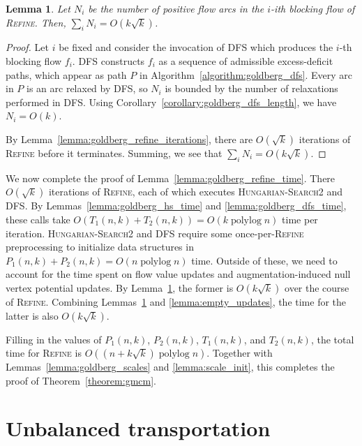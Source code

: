 \documentclass[11pt]{article}
\def\polylog{\mathop{\mathrm{polylog}}}
\theoremstyle{plain}
\newtheorem{lemma}{Lemma}[section]
\numberwithin{figure}{section}
\begin{document}
\begin{lemma}
\label{lemma:goldberg_bf_size}
Let $N_i$ be the number of positive flow arcs in the $i$-ith blocking flow
of \textsc{Refine}.
Then, $\sum_i N_i = O(k\sqrt{k})$.
\end{lemma}

\begin{proof}
Let $i$ be fixed and consider the invocation of \textsc{DFS} which produces the
$i$-th blocking flow $f_i$.
\textsc{DFS} constructs $f_i$ as a sequence of admissible excess-deficit paths,
which appear as path $P$ in Algorithm~\ref{algorithm:goldberg_dfs}.
Every arc in $P$ is an arc relaxed by \textsc{DFS}, so $N_i$ is bounded by the
number of relaxations performed in \textsc{DFS}.
Using Corollary~\ref{corollary:goldberg_dfs_length}, we have $N_i = O(k)$.

By Lemma~\ref{lemma:goldberg_refine_iterations}, there are $O(\sqrt{k})$
iterations of \textsc{Refine} before it terminates.
Summing, we see that $\sum_i N_i = O(k\sqrt{k})$.
\end{proof}

We now complete the proof of Lemma~\ref{lemma:goldberg_refine_time}.
There $O(\sqrt{k})$ iterations of \textsc{Refine}, each of which executes
\textsc{Hungarian-Search2} and \textsc{DFS}.
By Lemmas~\ref{lemma:goldberg_hs_time} and \ref{lemma:goldberg_dfs_time},
these calls take $O(T_1(n, k) + T_2(n, k)) = O(k\polylog n)$ time per
iteration.
\textsc{Hungarian-Search2} and \textsc{DFS} require some
once-per-\textsc{Refine} preprocessing to initialize data structures
in $P_1(n, k) + P_2(n, k) = O(n\polylog n)$ time.
Outside of these, we need to account for the time spent on flow value updates
and augmentation-induced null vertex potential updates.
By Lemma~\ref{lemma:goldberg_bf_size}, the former is $O(k\sqrt{k})$ over the
course of \textsc{Refine}.
Combining Lemmas~\ref{lemma:goldberg_bf_size} and \ref{lemma:empty_updates},
the time for the latter is also $O(k\sqrt{k})$.

Filling in the values of $P_1(n, k)$, $P_2(n, k)$, $T_1(n, k)$, and
$T_2(n, k)$, the total time for \textsc{Refine} is
$O((n + k\sqrt{k})\polylog n)$.
Together with Lemmas~\ref{lemma:goldberg_scales} and \ref{lemma:scale_init},
this completes the proof of Theorem~\ref{theorem:gmcm}.


\section{Unbalanced transportation}
\end{document}
